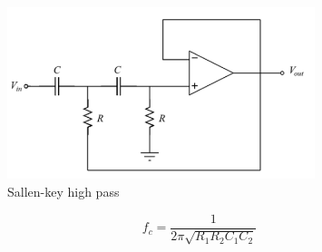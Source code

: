 \begin{figure}[h]
    \centering
    \includegraphics[width=0.8\textwidth]{images/2ndHigh.png}
    \caption{Sallen-key high pass}
    \label{}
\end{figure}
\begin{equation}
    f_c = \frac{1}{2\pi\sqrt{R_1R_2C_1C_2}}
\end{equation}